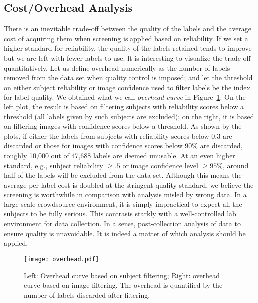 \documentclass[10pt,journal,letterpaper,compsoc,twoside]{IEEEtran}
\begin{document}
\subsection{Cost/Overhead Analysis} 

There is an inevitable trade-off between the quality of the labels and the average cost of acquiring them when screening is applied based on reliability. If we set a higher standard for reliability, the quality of the labels retained tends to improve but we are left with fewer labels to use. It is interesting to visualize the trade-off quantitatively.  Let us define overhead numerically as the number of labels removed from the data set when quality control is imposed; and let the threshold on either subject reliability or image confidence used to filter labels be the index for label quality. We obtained what we call {\em overhead curve} in
Figure~\ref{fig:overhead}. On the left plot, the result is based on filtering subjects with reliability scores below a
threshold (all labels given by such subjects are excluded); on the right, it is based on filtering images with confidence scores below a threshold. As shown by the plots,
if either the labels from subjects with reliability scores below 0.3 are discarded or those for images with confidence scores below 90\% are discarded, roughly 10,000 out of 47,688
labels are deemed unusable. At an even higher standard, e.g., subject reliability $\geq .5$ or image confidence level $\geq 95\%$, around half of the labels will be excluded from the data set. Although this means the average per label cost is doubled at the stringent quality standard, we believe the screening is worthwhile in comparison with analysis misled by wrong data. In a large-scale crowdsource environment, it is simply impractical to expect all the subjects to be fully serious. This contrasts starkly with a well-controlled lab environment for data collection. In a sense, post-collection analysis of data to ensure quality is unavoidable. It is indeed a matter of which analysis should be applied. 

\begin{figure}[htp]
\texttt{[image: overhead.pdf]}
\caption{Left: Overhead curve based on subject filtering; Right: overhead curve based on image filtering. The overhead is quantified by the number of labels discarded after filtering.}\label{fig:overhead}
\end{figure}

\end{document}
